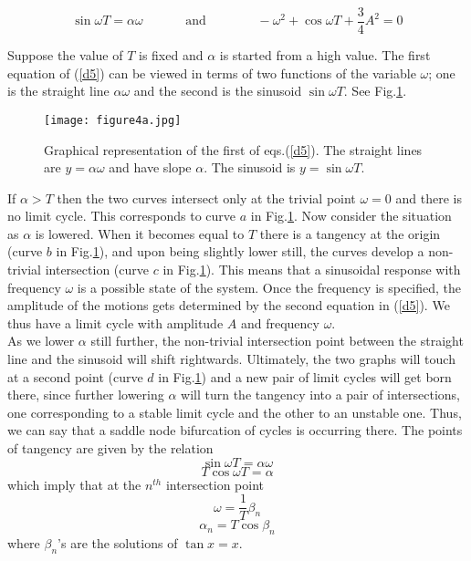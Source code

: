 \documentclass[12pt]{article}
\begin{document}
\begin{equation}
\sin \omega T = \alpha \omega \mbox{~~~~~~~~~~and ~~~~~~~~~~~}-\omega^2+\cos\omega T +\frac{3}{4} A^2 = 0
\label{d5} 
\end{equation}

Suppose the value of $T$ is fixed and $\alpha$ is started from a high value. The first equation of (\ref{d5}) can be viewed in terms of two functions of the variable $\omega$; one is the straight line $\alpha \omega$ and the second is the sinusoid $\sin \omega T$. 
See Fig.\ref{fig:foo1}.\\
\begin{figure}[h!]
	\begin{center}
		\texttt{[image: figure4a.jpg]}
		\caption{Graphical representation of the first of eqs.(\ref{d5}).  The straight lines are $y=\alpha\omega$ and have slope $\alpha$. 
			The sinusoid is $y=\sin \omega T$.}
		\label{fig:foo1}
	\end{center}
\end{figure}

If $\alpha > T$ then the two curves intersect only at the trivial point $\omega=0$ and there is no limit cycle. This corresponds to curve $a$ in Fig.\ref{fig:foo1}.  Now consider the situation as $\alpha$ is lowered. When it becomes equal to $T$ there is a tangency at the origin (curve $b$ in Fig.\ref{fig:foo1}), and upon being slightly lower still, the curves develop a non-trivial intersection (curve $c$ in Fig.\ref{fig:foo1}). This means that a sinusoidal response with frequency $\omega$ is a possible state of the system. Once the frequency is specified, the amplitude of the motions gets determined by the second equation in (\ref{d5}). We thus have a limit cycle with amplitude $A$ and frequency $\omega$. \\

As we lower $\alpha$ still further, the non-trivial intersection point between the straight line and the sinusoid will shift rightwards. Ultimately, the two graphs will touch at a second point (curve $d$ in Fig.\ref{fig:foo1}) and a new pair of limit cycles will get born there, since further lowering $\alpha$ will turn the tangency into a pair of intersections, one corresponding to a stable limit cycle and the other to an unstable one. Thus, we can say that a saddle node bifurcation of cycles is occurring there. The points of tangency are given by the relation
\begin{equation}
\sin \omega T =\alpha \omega
\end{equation}
\begin{equation}
T \cos \omega T =\alpha
\end{equation}
which imply that at the $n^{th}$ intersection point
\begin{equation}
\omega =\frac{1}{T }{{\beta }_{n}}
\label{goo1}
\end{equation}
\begin{equation}
{{\alpha }_{n}}=T \cos {{\beta }_{n}}
\label{goo2}
\end{equation}
where $\beta _{n}$'s are the solutions of $\tan x = x$.\\
\end{document}
